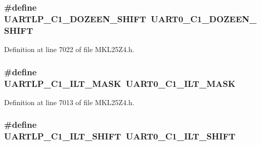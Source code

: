 \subsubsection[{\texorpdfstring{U\+A\+R\+T\+L\+P\+\_\+\+C1\+\_\+\+D\+O\+Z\+E\+E\+N\+\_\+\+S\+H\+I\+FT}{UARTLP_C1_DOZEEN_SHIFT}}]{\setlength{\rightskip}{0pt plus 5cm}\#define U\+A\+R\+T\+L\+P\+\_\+\+C1\+\_\+\+D\+O\+Z\+E\+E\+N\+\_\+\+S\+H\+I\+FT~{\bf U\+A\+R\+T0\+\_\+\+C1\+\_\+\+D\+O\+Z\+E\+E\+N\+\_\+\+S\+H\+I\+FT}}\hypertarget{group___backward___compatibility___symbols_ga643a9b2d4426aa5f6cd371cf81b95404}{}\label{group___backward___compatibility___symbols_ga643a9b2d4426aa5f6cd371cf81b95404}


Definition at line 7022 of file M\+K\+L25\+Z4.\+h.

\subsubsection[{\texorpdfstring{U\+A\+R\+T\+L\+P\+\_\+\+C1\+\_\+\+I\+L\+T\+\_\+\+M\+A\+SK}{UARTLP_C1_ILT_MASK}}]{\setlength{\rightskip}{0pt plus 5cm}\#define U\+A\+R\+T\+L\+P\+\_\+\+C1\+\_\+\+I\+L\+T\+\_\+\+M\+A\+SK~{\bf U\+A\+R\+T0\+\_\+\+C1\+\_\+\+I\+L\+T\+\_\+\+M\+A\+SK}}\hypertarget{group___backward___compatibility___symbols_ga0efd0cf26f2b583d1b21cc8cc3f487fe}{}\label{group___backward___compatibility___symbols_ga0efd0cf26f2b583d1b21cc8cc3f487fe}


Definition at line 7013 of file M\+K\+L25\+Z4.\+h.

\subsubsection[{\texorpdfstring{U\+A\+R\+T\+L\+P\+\_\+\+C1\+\_\+\+I\+L\+T\+\_\+\+S\+H\+I\+FT}{UARTLP_C1_ILT_SHIFT}}]{\setlength{\rightskip}{0pt plus 5cm}\#define U\+A\+R\+T\+L\+P\+\_\+\+C1\+\_\+\+I\+L\+T\+\_\+\+S\+H\+I\+FT~{\bf U\+A\+R\+T0\+\_\+\+C1\+\_\+\+I\+L\+T\+\_\+\+S\+H\+I\+FT}}\hypertarget{group___backward___compatibility___symbols_ga337530c2b176d78ca6c28da4ab325783}{}\label{group___backward___compatibility___symbols_ga337530c2b176d78ca6c28da4ab325783}


